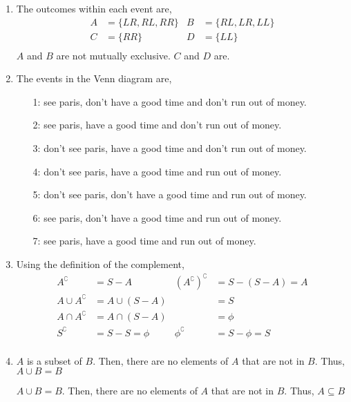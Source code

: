 \begin{enumerate}
    \item The outcomes within each event are,
          \begin{align}
              A & = \{LR, RL, RR\} & B & = \{RL, LR, LL\} \\
              C & = \{RR\}         & D & = \{LL\}         \\
          \end{align}
          $ A $ and $ B $ are not mutually exclusive.
          $ C $ and $ D $ are.

    \item The events in the Venn diagram are,
          \begin{itemize}
              \item[1:] see paris, don't have a good time and don't run out of money.
              \item[2:] see paris, have a good time and don't run out of money.
              \item[3:] don't see paris, have a good time and don't run out of money.
              \item[4:] don't see paris, have a good time and run out of money.
              \item[5:] don't see paris, don't have a good time and run out of money.
              \item[6:] see paris, don't have a good time and run out of money.
              \item[7:] see paris, have a good time and run out of money.
          \end{itemize}

    \item Using the definition of the complement,
          \begin{align}
              A^\complement               & = S-A           &
              (A^\complement)^\complement & = S - (S-A) = A   \\
              A \cup A^\complement        & = A \cup (S-A)  &
                                          & = S               \\
              A \cap A^\complement        & = A \cap (S-A)  &
                                          & = \phi            \\
              S^\complement               & = S - S = \phi  &
              \phi^\complement            & = S - \phi = S    \\
          \end{align}

    \item $A$ is a subset of $ B $. Then, there are no elements of $ A $ that are not in
          $ B $. Thus, $ A \cup B = B $ \par
          $ A \cup B = B $. Then, there are no elements of $ A $ that are not in
          $ B $. Thus, $ A \subseteq B $


\end{enumerate}
